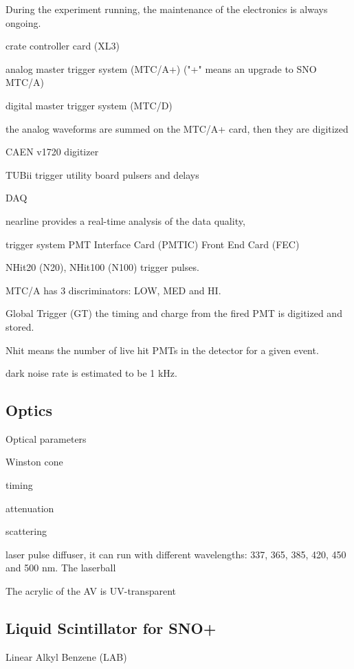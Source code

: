 During the experiment running, the maintenance of the electronics is always ongoing.

crate controller card (XL3)


analog master trigger system (MTC/A+) 
("+" means an upgrade to SNO MTC/A)


digital master trigger system (MTC/D)

the analog waveforms are summed on the MTC/A+ card, then they are digitized 

CAEN v1720 digitizer 

TUBii trigger utility board 
pulsers and delays

DAQ 


nearline provides a real-time analysis of the data quality, 

trigger system
PMT Interface Card (PMTIC)
Front End Card (FEC)

NHit20 (N20), NHit100 (N100) trigger pulses.

MTC/A has 3 discriminators: LOW, MED and HI.

Global Trigger (GT)
the timing and charge from the fired PMT is digitized and stored.




Nhit means the number of live hit PMTs in the detector for a given event.


dark noise rate is estimated to be 1 kHz.



\subsection{Optics}

Optical parameters

Winston cone



timing


attenuation

scattering


laser pulse diffuser, it can run with different wavelengths: 337, 365, 385, 420, 450 and 500 nm.
The laserball 

The acrylic of the AV is UV-transparent



\subsection{Liquid Scintillator for SNO+}


Linear Alkyl Benzene (LAB)

